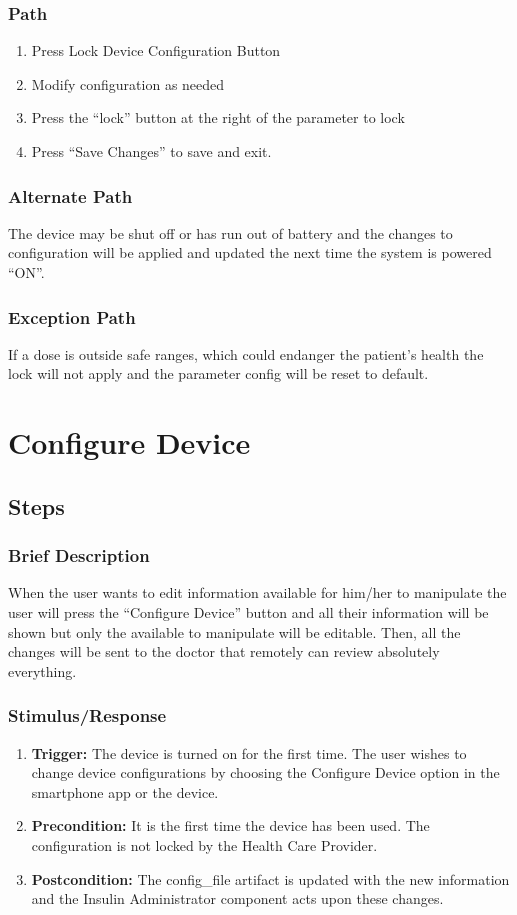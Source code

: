 \documentclass{scrreprt}
\begin{document}
    \subsubsection{Path}
    \begin{enumerate}
        \item Press Lock Device Configuration Button
        \item Modify configuration as needed
        \item Press the “lock” button at the right of the parameter to lock
        \item Press “Save Changes” to save and exit.
    \end{enumerate}
    \subsubsection{Alternate Path}
        The device may be shut off or has run out of battery and the changes to configuration will be applied and updated the next time the system is powered “ON”.
    \subsubsection{Exception Path}
        If a dose is outside safe ranges, which could endanger the patient’s health the lock will not apply and the parameter config will be reset to default.

\section{Configure Device}
\subsection{Steps}
    \subsubsection{Brief Description}
        When the user wants to edit information available for him/her to manipulate the user will press the “Configure Device” button and all their information will be shown but only the available to manipulate will be 
        editable. Then, all the changes will be sent to the doctor that remotely can review absolutely everything.
    \subsubsection{Stimulus/Response}
    \begin{enumerate}
        \item \textbf{Trigger:} The device is turned on for the first time. The user wishes to change device configurations by choosing the Configure Device option in the smartphone app or the device. 
        \item \textbf{Precondition:} It is the first time the device has been used. The configuration is not locked by the Health Care Provider.
        \item \textbf{Postcondition:} The config\_file artifact is updated with the new information and the Insulin Administrator component acts upon these changes.
    \end{enumerate}
\end{document}
